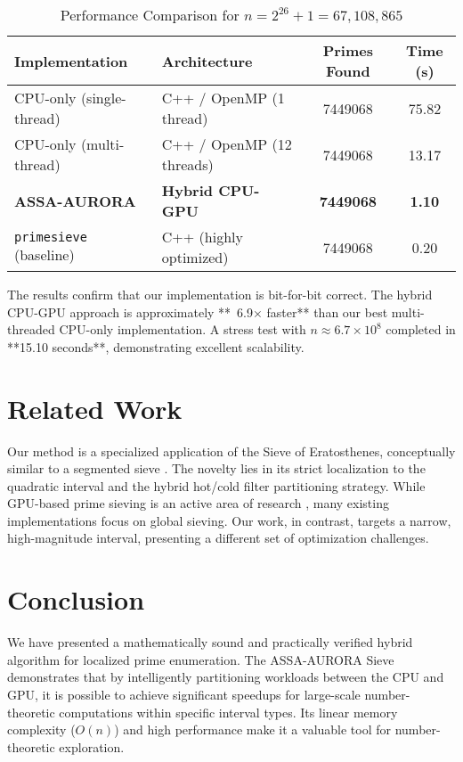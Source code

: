 \documentclass[11pt]{article}
\begin{document}
\begin{table}[h!]
\centering
\caption{Performance Comparison for $n = 2^{26} + 1 = 67,108,865$}
\label{tab:results_small_n}
\begin{tabular}{l l S[table-format=8.0] S[table-format=2.4]}
\toprule
\textbf{Implementation} & \textbf{Architecture} & {\textbf{Primes Found}} & {\textbf{Time (s)}} \\
\midrule
CPU-only (single-thread) & C++ / OpenMP (1 thread) & 7449068 & 75.82 \\
CPU-only (multi-thread) & C++ / OpenMP (12 threads) & 7449068 & 13.17 \\
\textbf{ASSA-AURORA} & \textbf{Hybrid CPU-GPU} & \textbf{7449068} & \textbf{1.10} \\
\texttt{primesieve} (baseline) & C++ (highly optimized) & 7449068 & 0.20 \\
\bottomrule
\end{tabular}
\end{table}

The results confirm that our implementation is bit-for-bit correct. The hybrid CPU-GPU approach is approximately **~6.9× faster** than our best multi-threaded CPU-only implementation. A stress test with $n \approx 6.7 \times 10^8$ completed in **15.10 seconds**, demonstrating excellent scalability.

\section{Related Work}
Our method is a specialized application of the Sieve of Eratosthenes, conceptually similar to a segmented sieve \cite{Crandall2005}. The novelty lies in its strict localization to the quadratic interval and the hybrid hot/cold filter partitioning strategy. While GPU-based prime sieving is an active area of research \cite{cudasieve}, many existing implementations focus on global sieving. Our work, in contrast, targets a narrow, high-magnitude interval, presenting a different set of optimization challenges.

\section{Conclusion}
We have presented a mathematically sound and practically verified hybrid algorithm for localized prime enumeration. The ASSA-AURORA Sieve demonstrates that by intelligently partitioning workloads between the CPU and GPU, it is possible to achieve significant speedups for large-scale number-theoretic computations within specific interval types. Its linear memory complexity ($O(n)$) and high performance make it a valuable tool for number-theoretic exploration.
\end{document}
